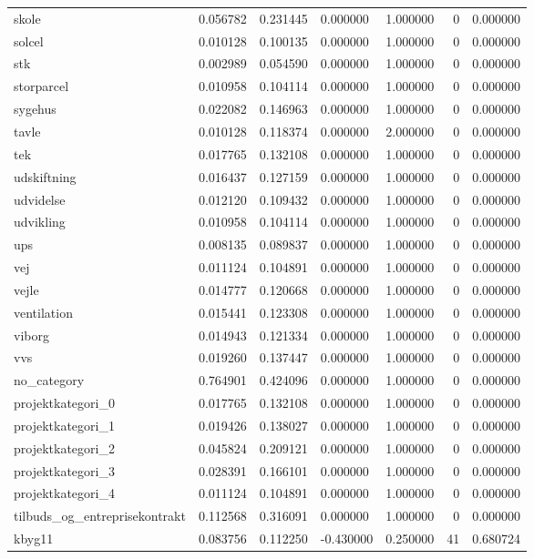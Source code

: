 \begin{landscape}
\begin{longtable}[h!]{lrrllrr}
skole & 0.056782 & 0.231445 & 0.000000 & 1.000000 & 0 & 0.000000 \\
solcel & 0.010128 & 0.100135 & 0.000000 & 1.000000 & 0 & 0.000000 \\
stk & 0.002989 & 0.054590 & 0.000000 & 1.000000 & 0 & 0.000000 \\
storparcel & 0.010958 & 0.104114 & 0.000000 & 1.000000 & 0 & 0.000000 \\
sygehus & 0.022082 & 0.146963 & 0.000000 & 1.000000 & 0 & 0.000000 \\
tavle & 0.010128 & 0.118374 & 0.000000 & 2.000000 & 0 & 0.000000 \\
tek & 0.017765 & 0.132108 & 0.000000 & 1.000000 & 0 & 0.000000 \\
udskiftning & 0.016437 & 0.127159 & 0.000000 & 1.000000 & 0 & 0.000000 \\
udvidelse & 0.012120 & 0.109432 & 0.000000 & 1.000000 & 0 & 0.000000 \\
udvikling & 0.010958 & 0.104114 & 0.000000 & 1.000000 & 0 & 0.000000 \\
ups & 0.008135 & 0.089837 & 0.000000 & 1.000000 & 0 & 0.000000 \\
vej & 0.011124 & 0.104891 & 0.000000 & 1.000000 & 0 & 0.000000 \\
vejle & 0.014777 & 0.120668 & 0.000000 & 1.000000 & 0 & 0.000000 \\
ventilation & 0.015441 & 0.123308 & 0.000000 & 1.000000 & 0 & 0.000000 \\
viborg & 0.014943 & 0.121334 & 0.000000 & 1.000000 & 0 & 0.000000 \\
vvs & 0.019260 & 0.137447 & 0.000000 & 1.000000 & 0 & 0.000000 \\
no_category & 0.764901 & 0.424096 & 0.000000 & 1.000000 & 0 & 0.000000 \\
projektkategori_0 & 0.017765 & 0.132108 & 0.000000 & 1.000000 & 0 & 0.000000 \\
projektkategori_1 & 0.019426 & 0.138027 & 0.000000 & 1.000000 & 0 & 0.000000 \\
projektkategori_2 & 0.045824 & 0.209121 & 0.000000 & 1.000000 & 0 & 0.000000 \\
projektkategori_3 & 0.028391 & 0.166101 & 0.000000 & 1.000000 & 0 & 0.000000 \\
projektkategori_4 & 0.011124 & 0.104891 & 0.000000 & 1.000000 & 0 & 0.000000 \\
tilbuds_og_entreprisekontrakt & 0.112568 & 0.316091 & 0.000000 & 1.000000 & 0 & 0.000000 \\
kbyg11 & 0.083756 & 0.112250 & -0.430000 & 0.250000 & 41 & 0.680724 \\

\end{longtable}
\end{landscape}
